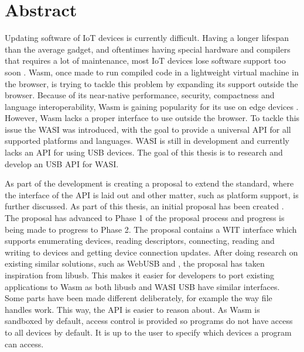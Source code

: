 \chapter*{Abstract}

Updating software of \acrfull{IoT} devices is currently difficult. Having a longer lifespan than the average gadget, and oftentimes having special hardware and compilers that requires a lot of maintenance, most \acrshort{IoT} devices lose software support too soon \cite{wasi_iot}.
\acrfull{Wasm}, once made to run compiled code in a lightweight virtual machine in the browser, is trying to tackle this problem by expanding its support outside the browser. Because of its near-native performance, security, compactness and language interoperability, \acrshort{Wasm} is gaining popularity for its use on edge devices \cite{wasi_iot}. However, \acrshort{Wasm} lacks a proper interface to use outside the browser. To tackle this issue the \acrfull{WASI} was introduced, with the goal to provide a universal \acrshort{API} for all supported platforms and languages. \acrshort{WASI} is still in development and currently lacks an \acrshort{API} for using USB devices. The goal of this thesis is to research and develop an \acrshort{USB} \acrshort{API} for \acrshort{WASI}.

As part of the development is creating a proposal to extend the standard, where the interface of the \acrshort{API} is laid out and other matter, such as platform support, is further discussed. As part of this thesis, an initial proposal has been created \cite{wasi_usb}. The proposal has advanced to Phase 1 of the proposal process \cite{proposal_phases} and progress is being made to progress to Phase 2. The proposal contains a \acrshort{WIT} interface which supports enumerating devices, reading descriptors, connecting, reading and writing to devices and getting device connection updates. After doing research on existing similar solutions, such as WebUSB \cite{WebUSB} and \cite{LibUSB}, the proposal has taken inspiration from libusb. This makes it easier for developers to port existing applications to \acrshort{Wasm} as both libusb and \acrshort{WASI} \acrshort{USB} have similar interfaces. Some parts have been made different deliberately, for example the way file handles work. This way, the \acrshort{API} is easier to reason about. As \acrshort{Wasm} is sandboxed by default, access control is provided so programs do not have access to all devices by default. It is up to the user to specify which devices a program can access.

